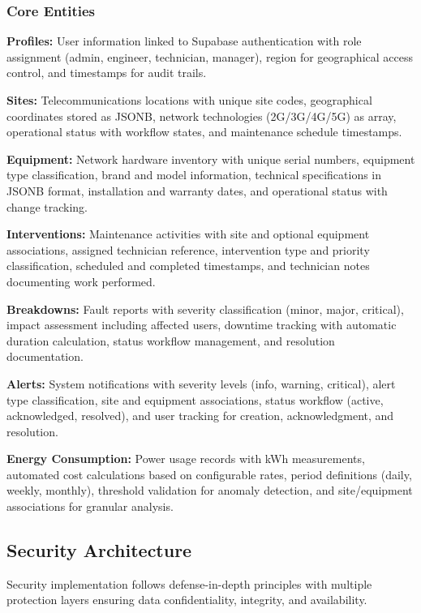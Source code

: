 \subsubsection{Core Entities}

\textbf{Profiles:} User information linked to Supabase authentication with role assignment (admin, engineer, technician, manager), region for geographical access control, and timestamps for audit trails.

\textbf{Sites:} Telecommunications locations with unique site codes, geographical coordinates stored as JSONB, network technologies (2G/3G/4G/5G) as array, operational status with workflow states, and maintenance schedule timestamps.

\textbf{Equipment:} Network hardware inventory with unique serial numbers, equipment type classification, brand and model information, technical specifications in JSONB format, installation and warranty dates, and operational status with change tracking.

\textbf{Interventions:} Maintenance activities with site and optional equipment associations, assigned technician reference, intervention type and priority classification, scheduled and completed timestamps, and technician notes documenting work performed.

\textbf{Breakdowns:} Fault reports with severity classification (minor, major, critical), impact assessment including affected users, downtime tracking with automatic duration calculation, status workflow management, and resolution documentation.

\textbf{Alerts:} System notifications with severity levels (info, warning, critical), alert type classification, site and equipment associations, status workflow (active, acknowledged, resolved), and user tracking for creation, acknowledgment, and resolution.

\textbf{Energy Consumption:} Power usage records with kWh measurements, automated cost calculations based on configurable rates, period definitions (daily, weekly, monthly), threshold validation for anomaly detection, and site/equipment associations for granular analysis.

\subsection{Security Architecture}

Security implementation follows defense-in-depth principles with multiple protection layers ensuring data confidentiality, integrity, and availability.

